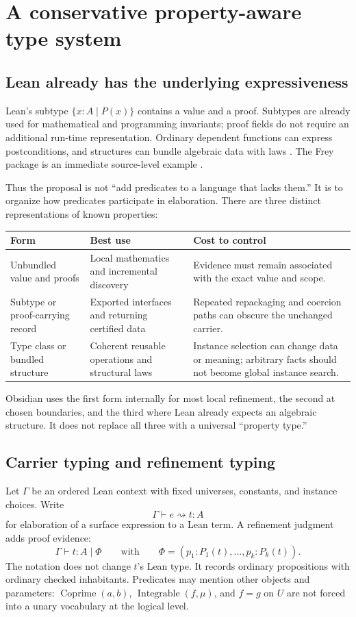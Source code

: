 \documentclass[11pt,a4paper]{article}
\theoremstyle{plain}\newtheorem{proposition}{Proposition}[section]
\theoremstyle{definition}\newtheorem{definition}[proposition]{Definition}
\theoremstyle{remark}\newtheorem{remark}[proposition]{Remark}
\begin{document}
\section{A conservative property-aware type system}\label{sec:types}
\subsection{Lean already has the underlying expressiveness}
Lean's subtype \(\{x:A\mid P(x)\}\) contains a value and a proof. Subtypes are already used for mathematical and programming invariants; proof fields do not require an additional run-time representation. Ordinary dependent functions can express postconditions, and structures can bundle algebraic data with laws \cite{subtypes}. The Frey package is an immediate source-level example \cite{freydef}.

Thus the proposal is not ``add predicates to a language that lacks them.'' It is to organize how predicates participate in elaboration. There are three distinct representations of known properties:
\begin{center}\small
\begin{tabularx}{\textwidth}{@{}P{.24\textwidth}Y Y@{}}
\toprule
Form & Best use & Cost to control\\
\midrule
Unbundled value and proofs & Local mathematics and incremental discovery & Evidence must remain associated with the exact value and scope.\\
Subtype or proof-carrying record & Exported interfaces and returning certified data & Repeated repackaging and coercion paths can obscure the unchanged carrier.\\
Type class or bundled structure & Coherent reusable operations and structural laws & Instance selection can change data or meaning; arbitrary facts should not become global instance search.\\
\bottomrule
\end{tabularx}
\end{center}
Obsidian uses the first form internally for most local refinement, the second at chosen boundaries, and the third where Lean already expects an algebraic structure. It does not replace all three with a universal ``property type.''

\subsection{Carrier typing and refinement typing}
Let \(\Gamma\) be an ordered Lean context with fixed universes, constants, and instance choices. Write
\[
 \Gamma\vdash e\rightsquigarrow t:A
\]
for elaboration of a surface expression to a Lean term. A refinement judgment adds proof evidence:
\[
 \Gamma\vdash t:A\mid\Phi
 \qquad\text{with}\qquad
 \Phi=(p_1:P_1(t),\ldots,p_k:P_k(t)).
\]
The notation does not change \(t\)'s Lean type. It records ordinary propositions with ordinary checked inhabitants. Predicates may mention other objects and parameters: \(\operatorname{Coprime}(a,b)\), \(\operatorname{Integrable}(f,\mu)\), and \(f=g\) on \(U\) are not forced into a unary vocabulary at the logical level.
\end{document}
